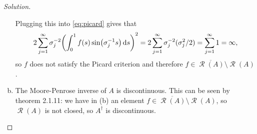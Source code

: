 \documentclass{article}
\theoremstyle{plain}
\theoremstyle{remark}
\newenvironment{solution}{\begin{proof}[Solution]\renewcommand\qedsymbol{}}{\end{proof}}
\newcommand{\Bb}{\mathbb}
\newcommand{\Cal}{\mathcal}
\newcommand\ZZ{\Bb Z}
\DeclarePairedDelimiter{\ang}{\langle}{\rangle}
\newcommand{\D}{^\dagger}
\newcommand\ind{\mathbbm 1} %
\newcommand\clos\overline
\DeclareMathOperator\Nul{\Cal N}
\DeclareMathOperator\Ran{\Cal R}
\begin{document}
\begin{solution}
\begin{enumerate}[(a)]
	Plugging this into \cref{eq:picard} gives that
	\[
	2\sum_{j=1}^\infty  \sigma_j^{-2} \qty(\int_0^1 f(s) \sin(\sigma_j^{-1} s) \dd{s})^2 = 2 \sum_{j=1}^\infty \sigma_j^{-2} (\sigma_j^2/2) = \sum_{j=1}^\infty 1 = \infty,
	\]
	so $f$ does not satisfy the Picard criterion and therefore $f \in \clos{\Ran(A)} \setminus \Ran(A)$. 
%	
%	
%
%

\item The Moore-Penrose inverse of $A$ is discontinuous. This can be seen by theorem 2.1.11: we have in (b) an element $f \in \clos{\Ran(A)} \setminus \Ran(A)$, so   $\Ran(A)$ is not closed, so $A\D$ is discontinuous. 

\end{enumerate}
\end{solution}
\end{document}
